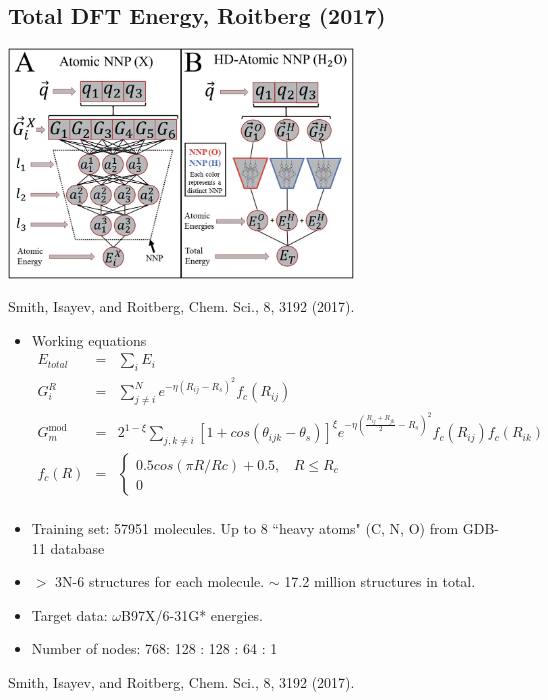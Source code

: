 \documentclass[handout]{beamer} %
\begin{document}
\subsection{Total DFT Energy, Roitberg (2017)} 

\begin{frame}
\begin{center}
\includegraphics[height=2.4in]{figures_ml/Roitberg_nn.png}
\end{center}
\vspace{5mm}
\begin{center}
\footnotesize{Smith, Isayev, and Roitberg, Chem. Sci., 8, 3192 (2017).}
\end{center} 
\end{frame}

\begin{frame}
\begin{itemize}
\item \scriptsize{Working equations}
\begin{eqnarray*}
E_{total} & = & \sum_{i} E_i   \\
G_i^R & = & \sum_{j \neq i} ^{N} e^{-\eta ( R_{ij} - R_s ) ^2 } f_c ( R_{ij} )  \\
G_m^{\textrm{mod}} & = & 2 ^ { 1-\xi} \sum_{j, k \neq i}   \left[ 1 + cos (\theta_{ijk} - \theta_s) \right]^ \xi 
e^ { - \eta \left( \frac{R_{ij} + R_{jk}} {2} - R_s \right)^2 } f_c  ( R_{ij} )  f_c  ( R_{ik} )    \\
f_c (R) &  = &  \left\{ \begin{array}{l}  0.5 cos \left( \pi R / Rc \right) + 0.5,~~~~ R \leq R_c \\ 0  \end{array} \right.   \\
\end{eqnarray*}
\item Training set: 57951 molecules.  Up to 8 ``heavy atoms" (C, N, O) from GDB-11 database 
\item $>$ 3N-6 structures for each molecule.   $\sim$ 17.2 million structures in total.   
\item Target data: $\omega$B97X/6-31G* energies.  
\item Number of nodes: 768: 128 : 128 : 64 : 1
\end{itemize}
\vspace{5mm}
\begin{center}
\footnotesize{Smith, Isayev, and Roitberg, Chem. Sci., 8, 3192 (2017).}
\end{center} 
\end{frame}
\end{document}
